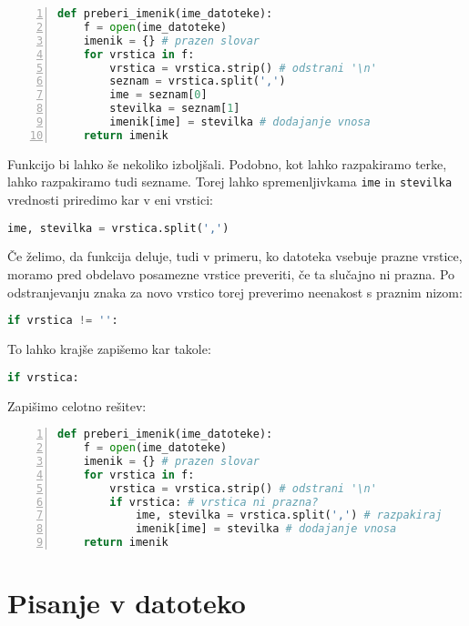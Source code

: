 \begin{resitev}
\begin{lstlisting}[language=Python, showstringspaces=false,numbers=left]
def preberi_imenik(ime_datoteke):
    f = open(ime_datoteke)
    imenik = {} # prazen slovar
    for vrstica in f:
        vrstica = vrstica.strip() # odstrani '\n'
        seznam = vrstica.split(',')
        ime = seznam[0]
        stevilka = seznam[1]
        imenik[ime] = stevilka # dodajanje vnosa
    return imenik
\end{lstlisting}
Funkcijo bi lahko še nekoliko izboljšali. Podobno, kot lahko razpakiramo terke, lahko razpakiramo tudi sezname. Torej lahko spremenljivkama \texttt{ime} in \texttt{stevilka} vrednosti priredimo kar v eni vrstici:
\begin{lstlisting}[language=Python, showstringspaces=false]
ime, stevilka = vrstica.split(',')
\end{lstlisting}
Če želimo, da funkcija deluje, tudi v primeru, ko datoteka vsebuje prazne vrstice, moramo pred obdelavo posamezne vrstice preveriti, če ta slučajno ni prazna. Po odstranjevanju znaka za novo vrstico torej preverimo neenakost s praznim nizom:
\begin{lstlisting}[language=Python, showstringspaces=false]
if vrstica != '':
\end{lstlisting}
To lahko krajše zapišemo kar takole:
\begin{lstlisting}[language=Python, showstringspaces=false]
if vrstica:
\end{lstlisting}
Zapišimo celotno rešitev:
\begin{lstlisting}[language=Python, showstringspaces=false,numbers=left]
def preberi_imenik(ime_datoteke):
    f = open(ime_datoteke)
    imenik = {} # prazen slovar
    for vrstica in f:
        vrstica = vrstica.strip() # odstrani '\n'
        if vrstica: # vrstica ni prazna?
            ime, stevilka = vrstica.split(',') # razpakiraj
            imenik[ime] = stevilka # dodajanje vnosa
    return imenik
\end{lstlisting}
\end{resitev}

\section{Pisanje v datoteko}

